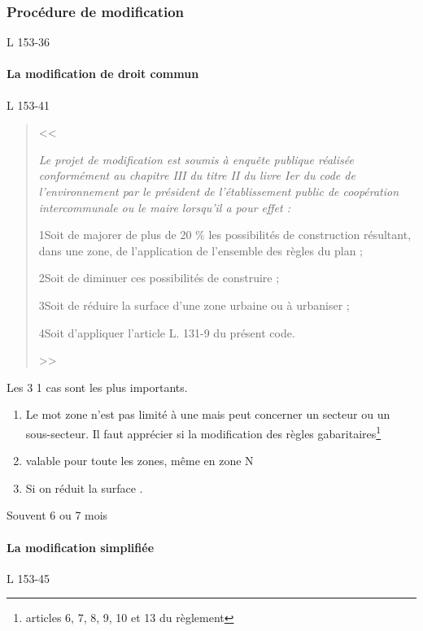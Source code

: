 	 	\subsubsection{Procédure de modification} L 153-36

		 	\paragraph{La modification de droit commun} L 153-41

		 		\begin{quote}
		 			<< {\itshape
		 				Le projet de modification est soumis à enquête publique réalisée conformément au chapitre III du titre II du livre Ier du code de l'environnement par le président de l'établissement public de coopération intercommunale ou le maire lorsqu'il a pour effet :

		 				1\degres Soit de majorer de plus de 20 \% les possibilités de construction résultant, dans une zone, de l'application de l'ensemble des règles du plan ;

		 				2\degres Soit de diminuer ces possibilités de construire ;

		 				3\degres Soit de réduire la surface d'une zone urbaine ou à urbaniser ;

		 				4\degres Soit d'appliquer l'article L. 131-9 du présent code.
		 			} >>
		 		\end{quote}

	 			Les 3 1\iers{} cas sont les plus importants.
	 			\begin{enumerate}
	 				\item Le mot zone n'est pas limité à une mais peut concerner un secteur ou un sous-secteur. Il faut apprécier si la modification des règles gabaritaires\footnote{articles 6, 7, 8, 9, 10 et 13 du règlement}

	 				\item  valable pour toute les zones, même en zone N

	 				\item Si on réduit la surface .
	 			\end{enumerate}

	 		Souvent 6 ou 7 mois

	 		\paragraph{La modification simplifiée} L 153-45


